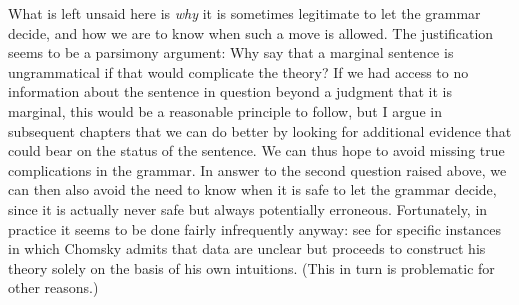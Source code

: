 \noindent 
What is left unsaid here is \textit{why} it is sometimes legitimate to let the grammar decide, and how we are to know when such a move is allowed. The justification seems to be a parsimony argument: Why say that a marginal sentence is ungrammatical if that would complicate the theory? If we had access to no information about the sentence in question beyond a judgment that it is marginal, this would be a reasonable principle to follow, but I argue in subsequent chapters that we can do better by looking for additional evidence that could bear on the status of the sentence. We can thus hope to avoid missing true complications in the grammar. In answer to the second question raised above, we can then also avoid the need to know when it is safe to let the grammar decide, since it is actually never safe but
always potentially erroneous. Fortunately, in practice it seems to be done fairly infrequently anyway: see \citet{Labov1975} for specific instances in which Chomsky admits that data are unclear but proceeds to construct his theory solely on the basis of his own intuitions. (This in turn is problematic for other reasons.)

